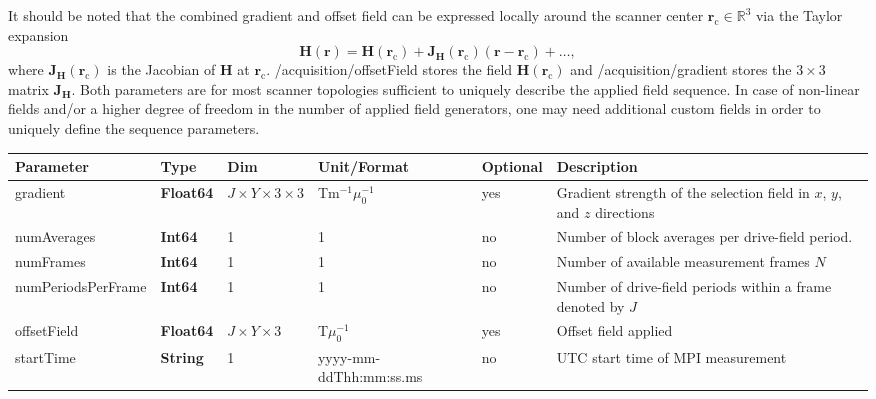 \documentclass[landscape,a4paper]{article} %
\newcommand{\inltab}[1]{{\ttfamily\bfseries\color{blue}#1}}
\newcommand{\inlvar}[1]{{\ttfamily#1}}
\begin{document}
\begin{multicols}{2}
It should be noted that the combined gradient and offset field can be expressed locally around the scanner center $\mathbf r_\text{c}\in \mathbb R^3$ via the Taylor expansion
\begin{equation}
	\mathbf H(\mathbf r) = \mathbf H(\mathbf r_\text{c}) + \mathbf J_{\mathbf H}(\mathbf r_\text{c}) (\mathbf r - \mathbf r_\text{c}) + \dots,
\end{equation}
where $\mathbf J_{\mathbf H}(\mathbf r_\text{c})$ is the Jacobian of $\mathbf H$ at $\mathbf r_\text{c}$. \inlvar{/acquisition/offsetField} stores the field $\mathbf H(\mathbf r_\text{c})$ and \inlvar{/acquisition/gradient} stores the $3\times 3$ matrix $\mathbf J_{\mathbf H}$. Both parameters are for most scanner topologies sufficient to uniquely describe the applied field sequence. In case of non-linear fields and/or a higher degree of freedom in the number of applied field generators, one may need additional custom fields in order to uniquely define the sequence parameters.

\end{multicols}

\setlength\extrarowheight{5pt}
\noindent \begin{tabularx}{\columnwidth}{lllllX}
\textbf{Parameter} & \textbf{Type} & \textbf{Dim} & \textbf{Unit/Format} & \textbf{Optional} & \textbf{Description} \\ \hline
\inlvar{gradient} & \inltab{Float64} & $J \times Y \times 3 \times 3$ & Tm$^{-1}\mu_0^{-1}$ & yes & Gradient strength of the selection field in $x$, $y$, and $z$ directions \\ \hline
\inlvar{numAverages} & \inltab{Int64} & 1 & 1& no & Number of block averages per drive-field period. \\ \hline
\inlvar{numFrames} & \inltab{Int64} & 1 & 1& no & Number of available measurement frames $N$ \\ \hline
\inlvar{numPeriodsPerFrame} & \inltab{Int64} & 1 & 1 & no & Number of drive-field periods within a frame denoted by $J$ \\ \hline
\inlvar{offsetField} & \inltab{Float64} & $J \times Y \times 3$ & T$\mu_0^{-1}$ & yes & Offset field applied  \\ \hline
\inlvar{startTime} & \inltab{String} & 1 & yyyy-mm-ddThh:mm:ss.ms & no & UTC start time of MPI measurement \\ \hline
\end{tabularx}
\setlength\extrarowheight{0pt}

\newpage
\end{document}

